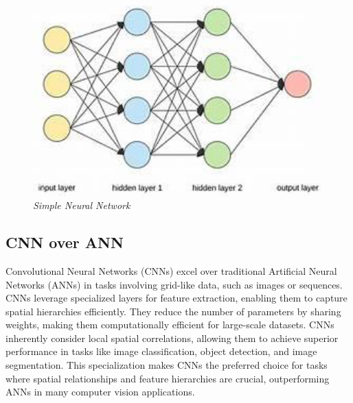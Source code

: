\documentclass[12pt, a4paper]{report}
\begin{document}
\begin{figure}[htbp]
    \centering
    \includegraphics[width=1\textwidth]{report images/image3.png}
    \caption{\textit{Simple Neural Network}}
\end{figure}

\subsection{CNN over ANN}
Convolutional Neural Networks (CNNs) excel over traditional Artificial Neural Networks (ANNs) in tasks involving grid-like data, such as images or sequences. CNNs leverage specialized layers for feature extraction, enabling them to capture spatial hierarchies efficiently. They reduce the number of parameters by sharing weights, making them computationally efficient for large-scale datasets. CNNs inherently consider local spatial correlations, allowing them to achieve superior performance in tasks like image classification, object detection, and image segmentation. This specialization makes CNNs the preferred choice for tasks where spatial relationships and feature hierarchies are crucial, outperforming ANNs in many computer vision applications.
\end{document}
